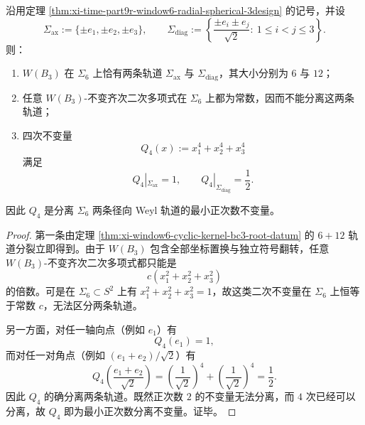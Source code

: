 \begin{proposition}\label{prop:xi-time-part9r-window6-radial-minimal-weyl-separator}
沿用定理 \ref{thm:xi-time-part9r-window6-radial-spherical-3design} 的记号，并设
\[
\Sigma_{\mathrm{ax}}:=\{\pm e_1,\pm e_2,\pm e_3\},
\qquad
\Sigma_{\mathrm{diag}}:=
\left\{
\frac{\pm e_i\pm e_j}{\sqrt2}:\ 1\le i<j\le 3
\right\}.
\]
则：
\begin{enumerate}
  \item \(W(B_3)\) 在 \(\Sigma_6\) 上恰有两条轨道 \(\Sigma_{\mathrm{ax}}\) 与 \(\Sigma_{\mathrm{diag}}\)，其大小分别为 \(6\) 与 \(12\)；
  \item 任意 \(W(B_3)\)-不变齐次二次多项式在 \(\Sigma_6\) 上都为常数，因而不能分离这两条轨道；
  \item 四次不变量
  \[
  Q_4(x):=x_1^4+x_2^4+x_3^4
  \]
  满足
  \[
  Q_4|_{\Sigma_{\mathrm{ax}}}=1,
  \qquad
  Q_4|_{\Sigma_{\mathrm{diag}}}=\frac12.
  \]
\end{enumerate}
因此 \(Q_4\) 是分离 \(\Sigma_6\) 两条径向 Weyl 轨道的最小正次数不变量。
\end{proposition}
\begin{proof}
第一条由定理 \ref{thm:xi-window6-cyclic-kernel-bc3-root-datum} 的 \(6+12\) 轨道分裂立即得到。由于 \(W(B_3)\) 包含全部坐标置换与独立符号翻转，任意 \(W(B_3)\)-不变齐次二次多项式都只能是
\[
c(x_1^2+x_2^2+x_3^2)
\]
的倍数。可是在 \(\Sigma_6\subset S^2\) 上有 \(x_1^2+x_2^2+x_3^2=1\)，故这类二次不变量在 \(\Sigma_6\) 上恒等于常数 \(c\)，无法区分两条轨道。

另一方面，对任一轴向点（例如 \(e_1\)）有
\[
Q_4(e_1)=1,
\]
而对任一对角点（例如 \((e_1+e_2)/\sqrt2\)）有
\[
Q_4\!\left(\frac{e_1+e_2}{\sqrt2}\right)
=
\left(\frac1{\sqrt2}\right)^4+\left(\frac1{\sqrt2}\right)^4
=
\frac12.
\]
因此 \(Q_4\) 的确分离两条轨道。既然正次数 \(2\) 的不变量无法分离，而 \(4\) 次已经可以分离，故 \(Q_4\) 即为最小正次数分离不变量。证毕。
\end{proof}

